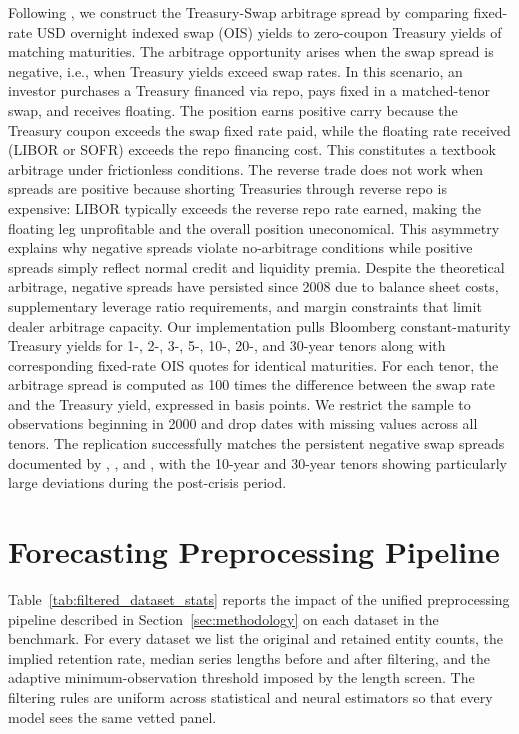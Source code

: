 \documentclass{article}
\newcommand{\floatsource}[1]{\caption*{\footnotesize\emph{#1}}}
\newcommand{\allsources}{Sources: Bloomberg, Board of Governors of the Federal Reserve System, Center for Research in Security Prices, Compustat, Call Reports, FINRA TRACE, OptionMetrics, S\&P Global, Open Source Bond Asset Pricing, He, Kelly, and Manela (2017), Authors' analysis}
\begin{document}
\begin{appendices}
Following \citet{Siriwardane2021}, we construct the Treasury-Swap arbitrage spread by comparing fixed-rate USD overnight indexed swap (OIS) yields to zero-coupon Treasury yields of matching maturities. The arbitrage opportunity arises when the swap spread is negative, i.e., when Treasury yields exceed swap rates. In this scenario, an investor purchases a Treasury financed via repo, pays fixed in a matched-tenor swap, and receives floating. The position earns positive carry because the Treasury coupon exceeds the swap fixed rate paid, while the floating rate received (LIBOR or SOFR) exceeds the repo financing cost. This constitutes a textbook arbitrage under frictionless conditions. The reverse trade does not work when spreads are positive because shorting Treasuries through reverse repo is expensive: LIBOR typically exceeds the reverse repo rate earned, making the floating leg unprofitable and the overall position uneconomical. This asymmetry explains why negative spreads violate no-arbitrage conditions while positive spreads simply reflect normal credit and liquidity premia. Despite the theoretical arbitrage, negative spreads have persisted since 2008 due to balance sheet costs, supplementary leverage ratio requirements, and margin constraints that limit dealer arbitrage capacity. Our implementation pulls Bloomberg constant-maturity Treasury yields for 1-, 2-, 3-, 5-, 10-, 20-, and 30-year tenors along with corresponding fixed-rate OIS quotes for identical maturities. For each tenor, the arbitrage spread is computed as 100 times the difference between the swap rate and the Treasury yield, expressed in basis points. We restrict the sample to observations beginning in 2000 and drop dates with missing values across all tenors. The replication successfully matches the persistent negative swap spreads documented by \citet{Jermann2020}, \citet{Du2023}, and \citet{Hanson2023}, with the 10-year and 30-year tenors showing particularly large deviations during the post-crisis period.

\section{Forecasting Preprocessing Pipeline}
\label{app:forecasting_preprocessing}

Table~\ref{tab:filtered_dataset_stats} reports the impact of the unified preprocessing pipeline described in Section~\ref{sec:methodology} on each dataset in the benchmark. For every dataset we list the original and retained entity counts, the implied retention rate, median series lengths before and after filtering, and the adaptive minimum-observation threshold imposed by the length screen. The filtering rules are uniform across statistical and neural estimators so that every model sees the same vetted panel.

\begin{table}[htbp]
\centering
\caption{Impact of Robust Forecasting Preprocessing on Dataset Statistics}
\label{tab:filtered_dataset_stats}

\floatsource{\allsources}
\end{table}

\end{appendices}
\end{document}
